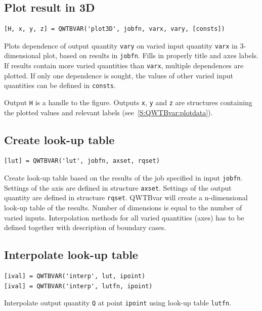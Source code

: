 \documentclass[12pt,a4paper,oneside]{report} %
\newcommand{\li}[1]{\lstinline{#1}}     %
\begin{document}
\subsection{Plot result in 3D}
\label{S:QWTBvar:plot3D}
\begin{lstlisting}
[H, x, y, z] = QWTBVAR('plot3D', jobfn, varx, vary, [consts])
\end{lstlisting}
Plots dependence of output quantity \li{vary} on varied input quantity
\li{varx} in 3-dimensional plot, based on results in \li{jobfn}.
Fills in properly title and axes labels. If results contain more varied
quantities than \li{varx}, multiple dependences are plotted.
If only one dependence is sought, the values of other varied input quantities
can be defined in \li{consts}.

Output \li{H} is a handle to the figure. Outputs \li{x}, \li{y} and \li{z} are
structures containing the plotted values and relevant labels
(see~\ref{S:QWTBvar:plotdata}).


\subsection{Create look-up table}
\label{S:QWTBvar:lut}
\begin{lstlisting}
[lut] = QWTBVAR('lut', jobfn, axset, rqset)
\end{lstlisting}
Create look-up table based on the results of the job specified in input
\li{jobfn}.
Settings of the axis are defined in structure \li{axset}.
Settings of the output quantity are defined in structure \li{rqset}.
QWTBvar will create a n-dimensional look-up table of the results. Number of
dimensions is equal to the number of varied inputs. Interpolation methods for
all varied quantities (axes) has to be defined together with description of
boundary cases.

\subsection{Interpolate look-up table}
\label{S:QWTBvar:interp}
\begin{lstlisting}
[ival] = QWTBVAR('interp', lut, ipoint)
[ival] = QWTBVAR('interp', lutfn, ipoint)
\end{lstlisting}
Interpolate output quantity \li{Q} at point \li{ipoint} using
look-up table \li{lutfn}.
\end{document}
